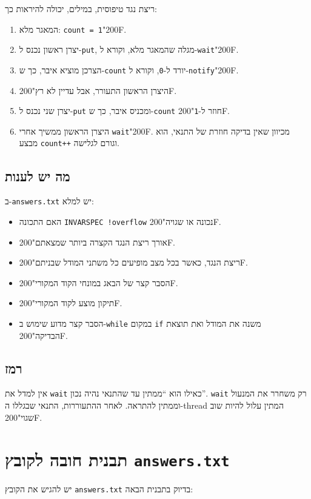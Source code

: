 \documentclass[11pt,a4paper]{article}
\newcommand{\RLM}{\char"200F}
\begin{document}
ריצת נגד טיפוסית, במילים, יכולה להיראות כך:
\begin{enumerate}
  \item המאגר מלא: \texttt{count = 1}\RLM.
  \item יצרן ראשון נכנס ל-\texttt{put}, מגלה שהמאגר מלא, וקורא ל-\texttt{wait}\RLM.
  \item הצרכן מוציא איבר, כך ש-\texttt{count} יורד ל-\texttt{0}, וקורא ל-\texttt{notify}\RLM.
  \item היצרן הראשון התעורר, אבל עדיין לא רץ\RLM.
  \item יצרן שני נכנס ל-\texttt{put} ומכניס איבר, כך ש-\texttt{count} חוזר ל-\texttt{1}\RLM.
  \item היצרן הראשון ממשיך אחרי \texttt{wait}\RLM. מכיוון שאין בדיקה חוזרת של התנאי, הוא מבצע \texttt{count++} וגורם לגלישה.
\end{enumerate}

\subsection*{מה יש לענות}
ב-\texttt{answers.txt} יש למלא:
\begin{itemize}
  \item האם התכונה \texttt{INVARSPEC !overflow} נכונה או שגויה\RLM.
  \item אורך ריצת הנגד הקצרה ביותר שמצאתם\RLM.
  \item ריצת הנגד, כאשר בכל מצב מופיעים כל משתני המודל שבניתם\RLM.
  \item הסבר קצר של הבאג במונחי הקוד המקורי\RLM.
  \item תיקון מוצע לקוד המקורי\RLM.
  \item הסבר קצר מדוע שימוש ב-\texttt{while} במקום \texttt{if} משנה את המודל ואת תוצאת הבדיקה\RLM.
\end{itemize}

\subsection*{רמז}
אין למדל את \texttt{wait} כאילו הוא ``ממתין עד שהתנאי נהיה נכון''. \texttt{wait} רק משחרר את המנעול וממתין להתראה. לאחר ההתעוררות, התנאי שבגללו ה-\textenglish{thread} המתין עלול להיות שוב שגוי\RLM.


\section{תבנית חובה לקובץ \texttt{answers.txt}}
יש להגיש את הקובץ \texttt{answers.txt} בדיוק בתבנית הבאה:
\end{document}
